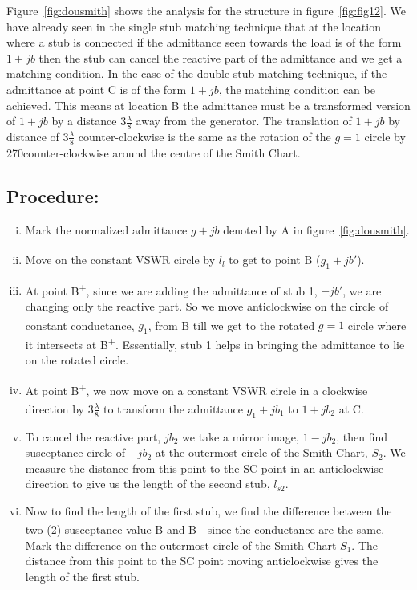 Figure~\ref{fig:dousmith} shows the analysis for the structure in figure~\ref{fig:fig12}. We have already seen in the single stub matching technique that at the location where a stub is connected if the admittance seen towards the load is of the form $1 +jb$ then the stub can cancel the reactive part of the admittance and we get a matching condition. In the case of the double stub matching technique, if the admittance at point C is of the form $1 + jb$, the matching condition can be achieved. This means at location B the admittance must be a transformed version of $1 + jb$ by a distance $3\frac{\lambda}{8}$ away from the generator. The translation of $1 + jb$ by distance of $3\frac{\lambda}{8}$ counter-clockwise is the same as the rotation of the $g = 1$ circle by 270\textdegree counter-clockwise around the centre of the Smith Chart.

\subsection*{Procedure:}
\begin{enumerate}[(i)]
\item Mark the normalized admittance $g + jb$ denoted by A in figure~\ref{fig:dousmith}.
\item Move on the constant VSWR circle by $l_l$ to get to point B\textsuperscript{\textemdash} ($g_1 + jb'$).
\item At point B\textsuperscript{+}, since we are adding the admittance of stub 1, $-jb'$, we are changing only the reactive part. So we move anticlockwise on the circle of constant conductance, $g_1$, from B\textsuperscript{\textemdash} till we get to the rotated $g = 1$ circle where it intersects at B\textsuperscript{+}. Essentially, stub 1 helps in bringing the admittance to lie on the rotated circle.
\item At point B\textsuperscript{+}, we now move on a constant VSWR circle in a clockwise direction by $ 3\frac{\lambda}{8}$ to transform the admittance $g_1 + jb_1$ to $1 + jb_2$ at C\textsuperscript{\textemdash}.
\item To cancel the reactive part, $jb_2$ we take a mirror image, $1-jb_2$, then find susceptance circle of $-jb_2$ at the outermost circle of the Smith Chart, $S_2$. We measure the distance from this point to the SC point in an anticlockwise direction to give us the length of the second stub, $l_{s2}$.
\item Now to find the length of the first stub, we find the difference between the two (2) susceptance value B\textsuperscript{\textemdash} and B\textsuperscript{+} since the conductance are the same. Mark the difference on the outermost circle of the Smith Chart $S_1$. The distance from this point to the SC point moving anticlockwise gives the length of the first stub.
\end{enumerate}

